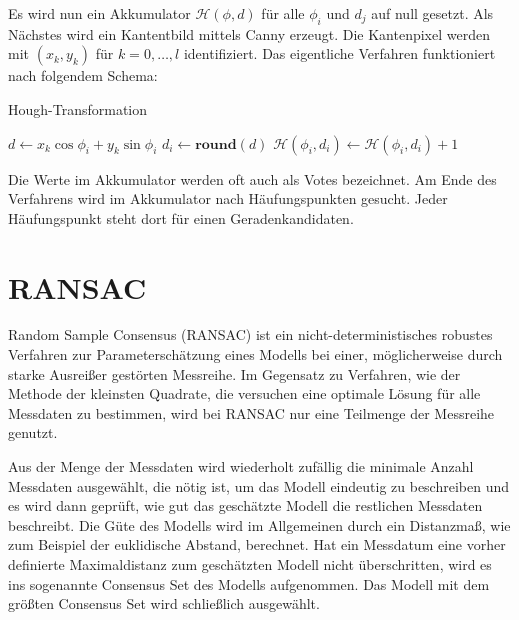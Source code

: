 Es wird nun ein Akkumulator $\mathcal{H}(\phi, d)$ für alle $\phi_i$ und $d_j$ auf null gesetzt.
Als Nächstes wird ein Kantentbild mittels Canny \cite{Canny1986} erzeugt. Die Kantenpixel werden mit $(x_k,y_k)$ für $k = 0,\dotsc,l$ identifiziert. Das eigentliche Verfahren funktioniert nach folgendem Schema:

\begin{algorithm}
	\caption{Hough-Transformation}\label{euclid}
	\begin{algorithmic}[1]
		 
		 
		\State $d \gets x_k\cos\phi_i + y_k\sin\phi_i$
		\State $d_i \gets \textbf{round}(d)$ 
		\State  $\mathcal{H}(\phi_i, d_i) \gets \mathcal{H}(\phi_i, d_i) + 1$
		\EndFor
		\EndFor
	\end{algorithmic}
\end{algorithm}

\FloatBarrier
Die Werte im Akkumulator werden oft auch als Votes bezeichnet. Am Ende des Verfahrens wird im Akkumulator nach Häufungspunkten gesucht. Jeder Häufungspunkt steht dort für einen Geradenkandidaten.




\section{RANSAC}
\label{s:ransac}
Random Sample Consensus (RANSAC) \cite{Fischler1981} ist ein nicht-deterministisches robustes Verfahren zur Parameterschätzung eines Modells bei einer, möglicherweise durch starke Ausreißer gestörten Messreihe.
Im Gegensatz zu Verfahren, wie der Methode der kleinsten Quadrate, die versuchen eine optimale Lösung für alle Messdaten zu bestimmen, wird bei RANSAC nur eine Teilmenge der Messreihe genutzt.

Aus der Menge der Messdaten wird wiederholt zufällig die minimale Anzahl Messdaten ausgewählt, die nötig ist, um das Modell eindeutig zu beschreiben und es wird dann geprüft, wie gut das geschätzte Modell die restlichen Messdaten beschreibt.
Die Güte des Modells wird im Allgemeinen durch ein Distanzmaß, wie zum Beispiel der euklidische Abstand, berechnet.
Hat ein Messdatum eine vorher definierte Maximaldistanz zum geschätzten Modell nicht überschritten, wird es ins sogenannte Consensus Set des Modells aufgenommen.
Das Modell mit dem größten Consensus Set wird schließlich ausgewählt.

